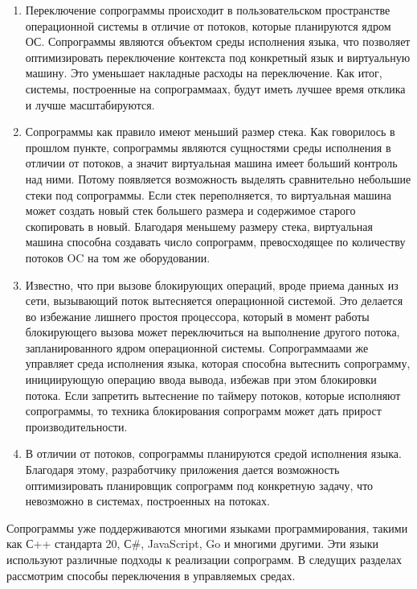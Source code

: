	\begin{enumerate}
		\item Переключение сопрограммы происходит в пользовательском пространстве операционной системы в отличие от
		потоков, которые планируются ядром ОС\cite{linux-kernel}. Сопрограммы являются объектом среды исполнения языка, что
		позволяет оптимизировать переключение контекста под конкретный язык и виртуальную машину. Это уменьшает
		накладные расходы на переключение. Как итог, системы, построенные на сопрограммаах, будут
		иметь лучшее время отклика и лучше масштабируются.
		\item Сопрограммы как правило имеют меньший размер стека. Как говорилось в прошлом пункте,
		сопрограммы являются сущностями среды исполнения в отличии от потоков, а значит виртуальная машина имеет больший
		контроль над ними. Потому появляется возможность выделять сравнительно небольшие стеки под сопрограммы. 
		Если стек переполняется, то виртуальная машина может создать новый стек большего размера и содержимое старого
		скопировать в новый. Благодаря меньшему размеру стека, виртуальная машина способна создавать число
		сопрограмм, превосходящее по количеству потоков OC на том же оборудовании.
		\item Известно, что при вызове блокирующих операций, вроде приема данных из сети, вызывающий поток вытесняется
		операционной системой\cite{linux-api}. Это делается во избежание лишнего простоя процессора, который в момент
		работы блокирующего вызова может переключиться на выполнение другого потока, запланированного ядром операционной
		системы. Сопрограммаами же управляет среда исполнения языка, которая способна вытеснить сопрограмму,
		инициирующую операцию ввода вывода, избежав при	этом блокировки потока. Если запретить
		вытеснение по таймеру потоков, которые исполняют сопрограммы, то техника блокирования сопрограмм
		может дать прирост производительности.
		\item В отличии от потоков, сопрограммы планируются средой исполнения языка. Благодаря этому, разработчику
		приложения дается возможность оптимизировать планировщик сопрограмм	под конкретную задачу, что невозможно в
		системах, построенных на потоках.
	\end{enumerate}
	Сопрограммы уже поддерживаются многими языками программирования, такими как С++ стандарта 20\cite{cpp20-coro},
	С\#, JavaScript,
	Go и многими другими. Эти языки используют различные подходы к реализации сопрограмм. В следущих разделах 
	рассмотрим способы переключения в управляемых средах.
	\clearpage
	
